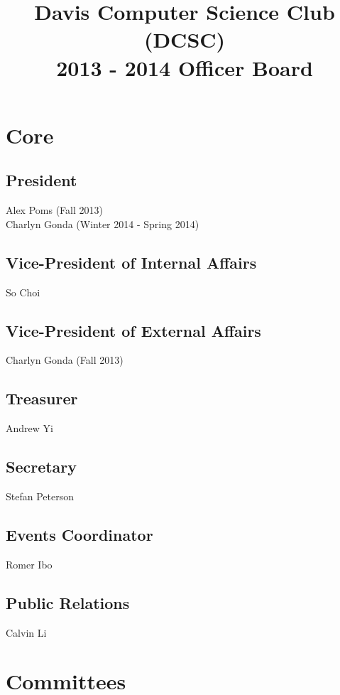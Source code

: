 \documentclass[10pt]{article}
\title{Davis Computer Science Club (DCSC)\\2013 - 2014 Officer Board}
\date{}
\author{}
\begin{document}
\maketitle

\section{Core}

\subsection{President}

Alex Poms (Fall 2013)\\
Charlyn Gonda (Winter 2014 - Spring 2014)

\subsection{Vice-President of Internal Affairs}

So Choi

\subsection{Vice-President of External Affairs}

Charlyn Gonda (Fall 2013)

\subsection{Treasurer}

Andrew Yi

\subsection{Secretary}

Stefan Peterson

\subsection{Events Coordinator}

Romer Ibo

\subsection{Public Relations}

Calvin Li

\section{Committees}
\end{document}
